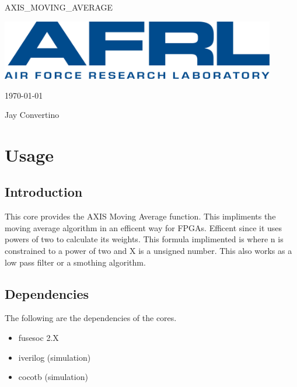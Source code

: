 \begin{titlepage}
  \begin{center}

  {\Huge AXIS\_MOVING\_AVERAGE}

  \vspace{25mm}

  \includegraphics[width=0.90\textwidth,height=\textheight,keepaspectratio]{img/AFRL.png}

  \vspace{25mm}

  \today

  \vspace{15mm}

  {\Large Jay Convertino}

  \end{center}
\end{titlepage}

\tableofcontents

\newpage

\section{Usage}

\subsection{Introduction}

\par
This core provides the AXIS Moving Average function. This impliments the moving average algorithm in an efficent way for FPGAs.
Efficent since it uses powers of two to calculate its weights. This formula implimented is where n is constrained
to a power of two and X is a unsigned number. This also works as a low pass filter or a smothing algorithm.

\subsection{Dependencies}

\par
The following are the dependencies of the cores.

\begin{itemize}
  \item fusesoc 2.X
  \item iverilog (simulation)
  \item cocotb (simulation)
\end{itemize}

